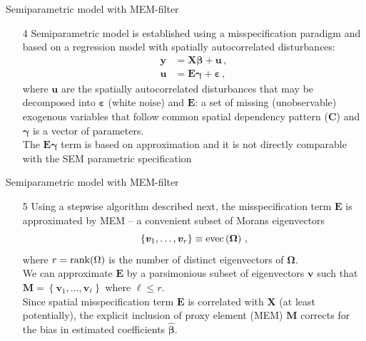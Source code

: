 \documentclass{beamer}
\begin{document}
\begin{frame}{Semiparametric model with MEM-filter}
\begin{itemize}
    \item[4] Semiparametric model is established using a misspecification paradigm and based on a regression model with spatially autocorrelated disturbances:
    \begin{equation*} 
    \begin{aligned}
    \bm{y} & = \bm{X\beta} + \bm{u} \,, \\
    \bm{u} & = \bm{E\gamma} + \bm{\varepsilon} \, ,
    \end{aligned}
    \end{equation*}
    where $\bm{u}$ are the spatially autocorrelated disturbances that may be decomposed into $\bm{\varepsilon}$ (white noise) and $\bm{E}$: a set of missing (unobservable) exogenous variables that follow common spatial dependency pattern ($\bm{C}$) and $\bm{\gamma}$ is a vector of parameters.
    \\ \medskip The $\bm{E\gamma}$ term is based on approximation and it is not directly comparable with the SEM parametric specification
\end{itemize}
\end{frame}
\begin{frame}{Semiparametric model with MEM-filter}
\begin{itemize}
    \item[5] Using a stepwise algorithm described next, the misspecification term $\bm{E}$ is approximated by MEM -- a convenient subset of Morans eigenvectors
\begin{equation*} 
\left\lbrace
\bm{v}_1, \dots , \bm{v}_{r} 
\right\rbrace 
\equiv 
\textnormal{evec}
\left(\bm{\Omega}\right) \, ,
\end{equation*}
where $r=\textnormal{rank}(\Omega)$ is the number of distinct eigenvectors of $\bm{\Omega}$. 
\\ \medskip 
We can approximate $\bm{E}$ by a parsimonious subset of eigenvectors $\bm{v}$ such that $\bm{M} = \left\lbrace \bm{v}_1, \dots , \bm{v}_{\ell} \right\rbrace$ where $\ell \leq r$. 
\\ \medskip 
Since spatial misspecification term $\bm{E}$ is correlated with $\bm{X}$ (at least potentially), the explicit inclusion of proxy element (MEM) $\bm{M}$ corrects for the bias in estimated coefficients $\hat{\bm{\beta}}$.
\end{itemize}
\end{frame}
\end{document}

